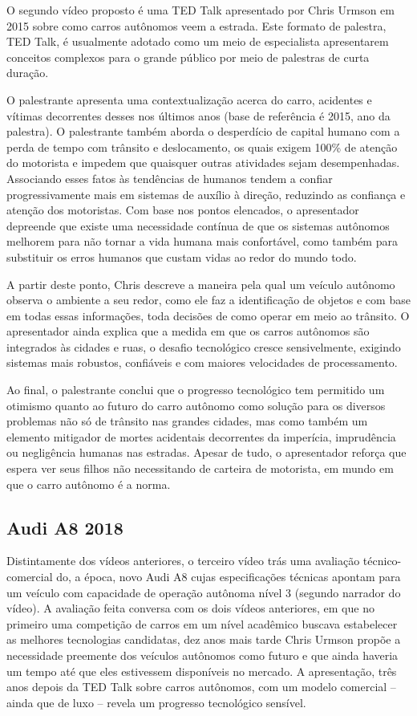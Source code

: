 O segundo vídeo proposto \cite{tedtalk} é uma TED Talk apresentado por Chris Urmson em 2015 sobre como carros autônomos veem a estrada. Este formato de palestra, TED Talk, é usualmente adotado como um meio de especialista apresentarem conceitos complexos para o grande público por meio de palestras de curta duração.

O palestrante apresenta uma contextualização acerca do carro, acidentes e vítimas decorrentes desses nos últimos anos (base de referência é 2015, ano da palestra). O palestrante também aborda o desperdício de capital humano com a perda de tempo com trânsito e deslocamento, os quais exigem 100\% de atenção do motorista e impedem que quaisquer outras atividades sejam desempenhadas. Associando esses fatos às tendências de humanos tendem a confiar progressivamente mais em sistemas de auxílio à direção, reduzindo as confiança e atenção dos motoristas. Com base nos pontos elencados, o apresentador depreende que existe uma necessidade contínua de que os sistemas autônomos melhorem para não tornar a vida humana mais confortável, como também para substituir os erros humanos que custam vidas ao redor do mundo todo. 

A partir deste ponto, Chris descreve a maneira pela qual um veículo autônomo observa o ambiente a seu redor, como ele faz a identificação de objetos e com base em todas essas informações, toda decisões de como operar em meio ao trânsito. O apresentador ainda explica que a medida em que os carros autônomos são integrados às cidades e ruas, o desafio tecnológico cresce sensivelmente, exigindo sistemas mais robustos, confiáveis e com maiores velocidades de processamento.

Ao final, o palestrante conclui que o progresso tecnológico tem permitido um otimismo quanto ao futuro do carro autônomo como solução para os diversos problemas não só de trânsito nas grandes cidades, mas como também um elemento mitigador de mortes acidentais decorrentes da imperícia, imprudência ou negligência humanas nas estradas. Apesar de tudo, o apresentador reforça que espera ver seus filhos não necessitando de carteira de motorista, em mundo em que o carro autônomo é a norma.

\subsection{Audi A8 2018}

Distintamente dos vídeos anteriores, o terceiro vídeo \cite{audiA8} trás uma avaliação técnico-comercial do, a época, novo Audi A8 cujas especificações técnicas apontam para um veículo com capacidade de operação autônoma nível 3 (segundo narrador do vídeo). A avaliação feita conversa com os dois vídeos anteriores, em que no primeiro \cite{darpa2005} uma competição de carros em um nível acadêmico buscava estabelecer as melhores tecnologias candidatas, dez anos mais tarde Chris Urmson \cite{tedtalk} propõe a necessidade preemente dos veículos autônomos como futuro e que ainda haveria um tempo até que eles estivessem disponíveis no mercado. A apresentação, três anos depois da TED Talk sobre carros autônomos, com um modelo comercial -- ainda que de luxo --  revela um progresso tecnológico sensível.


